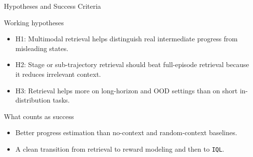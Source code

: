 \documentclass[aspectratio=169,11pt]{beamer}
\begin{document}
\begin{frame}[t]{Hypotheses and Success Criteria}
\small
\begin{block}{Working hypotheses}
  \begin{itemize}
    \item H1: Multimodal retrieval helps distinguish real intermediate progress from misleading states.
    \item H2: Stage or sub-trajectory retrieval should beat full-episode retrieval because it reduces irrelevant context.
    \item H3: Retrieval helps more on long-horizon and OOD settings than on short in-distribution tasks.
  \end{itemize}
\end{block}

\begin{block}{What counts as success}
  \begin{itemize}
    \item Better progress estimation than no-context and random-context baselines.
    \item A clean transition from retrieval to reward modeling and then to \texttt{IQL}.
  \end{itemize}
\end{block}
\end{frame}
\end{document}
